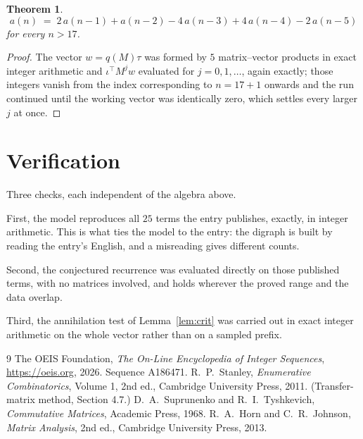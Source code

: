 \documentclass[11pt,a4paper]{article}
\theoremstyle{plain}
\newtheorem{theorem}{Theorem}
\theoremstyle{definition}
\begin{document}
\begin{theorem}
\[
a(n)\;=\;2\,a(n-1) + a(n-2) - 4\,a(n-3) + 4\,a(n-4) - 2\,a(n-5)
\]
for every $n>17$.
\end{theorem}

\begin{proof}
The vector $w=q(M)\tau$ was formed by $5$ matrix--vector products in exact integer
arithmetic and $\iota^{\!\top}M^{j}w$ evaluated for $j=0,1,\dots$, again exactly; those
integers vanish from the index corresponding to $n=17+1$ onwards and the run continued
until the working vector was identically zero, which settles every larger $j$ at once.
\end{proof}

\section{Verification}

Three checks, each independent of the algebra above.

First, the model reproduces all $25$ terms the entry publishes, exactly, in integer
arithmetic. This is what ties the model to the entry: the digraph is built by reading the
entry's English, and a misreading gives different counts.

Second, the conjectured recurrence was evaluated directly on those published terms, with no
matrices involved, and holds wherever the proved range and the data overlap.

Third, the annihilation test of Lemma~\ref{lem:crit} was carried out in exact integer
arithmetic on the whole vector rather than on a sampled prefix.

\begin{thebibliography}{9}
 The OEIS Foundation, \emph{The On-Line Encyclopedia of Integer
Sequences}, \url{https://oeis.org}, 2026. Sequence A186471.
 R.~P.~Stanley, \emph{Enumerative Combinatorics}, Volume 1, 2nd ed.,
Cambridge University Press, 2011. (Transfer-matrix method, Section 4.7.)
 D.~A.~Suprunenko and R.~I.~Tyshkevich, \emph{Commutative Matrices},
Academic Press, 1968.
 R.~A.~Horn and C.~R.~Johnson, \emph{Matrix Analysis}, 2nd ed., Cambridge
University Press, 2013.
\end{thebibliography}
\end{document}
